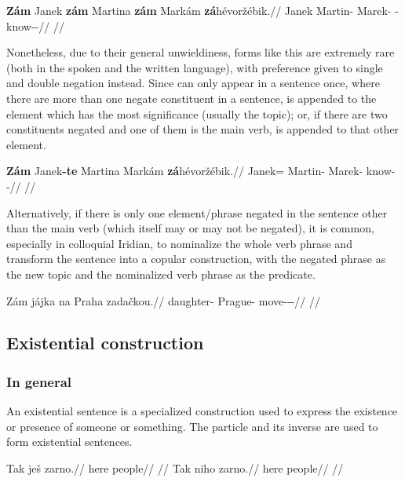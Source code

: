 \pex
\begingl
    \gla \textbf{Zám} Janek \textbf{zám} Martina \textbf{zám} Markám \textbf{zá}hévoržébik.//
    \glb \Neg{} Janek \Neg{} Martin-\Pat{} \Neg{} Marek-\Agt{} \Neg{}-know-\Ben{}-\Pf{}//
    \glft {}//
\endgl
\xe

Nonetheless, due to their general unwieldiness, forms like this are extremely
rare (both in the spoken and the written language), with preference given to
single and double negation instead. Since  can only appear in a
sentence once, where there are more than one negate constituent in a sentence,
 is appended to the element which has the most significance (usually
the topic); or, if there are two constituents negated and one of them is the
main verb,  is appended to that other element.

\pex
\begingl
    \gla \textbf{Zám} Janek\textbf{-te} Martina Markám \textbf{zá}hévoržébik.//
    \glb \Neg{} Janek=\Foc{} Martin-\Pat{} Marek-\Agt{} \Neg{}know-\Ben{}-\Pf{}//
    \glft {}//
\endgl
\xe

Alternatively, if there is only one element/phrase negated in the sentence other than the main verb (which itself may or may not be negated), it is common, especially in colloquial Iridian, to nominalize the whole verb phrase and transform the sentence into a copular construction, with the negated phrase as the new topic and the nominalized verb phrase as the predicate.

\pex
\begingl
    \gla Z\'am j\'ajka na Praha zada\v{c}kou.//
    \glb \Neg{} daughter-\Dim{} \Loc{} Prague-\Pat{} move-\Av{}-\Pf{}-\Nz{}//
    \glft {}//
\endgl
\xe



\subsection{Existential construction}
\label{sec:exst}

\subsubsection{In general}
An existential sentence is a specialized construction used to express the existence or presence of someone or something. The particle  and its inverse  are used to form existential sentences. 
\begin{multicols}{2}
\pex
\a\begingl
\gla Tak ješ zarno.//
\glb here \Exst{} people//
\glft {}//
\endgl
\a\begingl
\gla Tak niho zarno.//
\glb here \N{}\Exst{} people//
\glft {}//
\endgl
\xe
\end{multicols}

